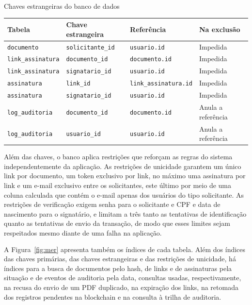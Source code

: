 \documentclass[
    12pt,
    a4paper,
    oneside,
    chapter=TITLE,
    section=TITLE,
    subsection=TITLE,
    subsubsection=TITLE,
    sumario=tradicional,
    english,
    brazil
]{abntex2}
\newcommand{\elem}[1]{\texttt{#1}}
\begin{document}
\begin{quadro}[htb]
    \caption{Chaves estrangeiras do banco de dados}
    \label{quadro:chaves}
    \centering
    \small
    \begin{tabular}{L{3.3cm}L{3.6cm}L{3.8cm}L{3.3cm}}
        \toprule
        \textbf{Tabela} & \textbf{Chave estrangeira} & \textbf{Referência} & \textbf{Na exclusão} \\
        \midrule
        \elem{documento} & \elem{solicitante\_id} & \elem{usuario.id} & Impedida \\
        \elem{link\_assinatura} & \elem{documento\_id} & \elem{documento.id} & Impedida \\
        \elem{link\_assinatura} & \elem{signatario\_id} & \elem{usuario.id} & Impedida \\
        \elem{assinatura} & \elem{link\_id} & \elem{link\_assinatura.id} & Impedida \\
        \elem{assinatura} & \elem{signatario\_id} & \elem{usuario.id} & Impedida \\
        \elem{log\_auditoria} & \elem{documento\_id} & \elem{documento.id} & Anula a referência \\
        \elem{log\_auditoria} & \elem{usuario\_id} & \elem{usuario.id} & Anula a referência \\
        \bottomrule
    \end{tabular}
\end{quadro}

Além das chaves, o banco aplica restrições que reforçam as regras do sistema independentemente da aplicação. As restrições de unicidade garantem um único link por documento, um token exclusivo por link, no máximo uma assinatura por link e um e-mail exclusivo entre os solicitantes, este último por meio de uma coluna calculada que contém o e-mail apenas dos usuários do tipo solicitante. As restrições de verificação exigem senha para o solicitante e CPF e data de nascimento para o signatário, e limitam a três tanto as tentativas de identificação quanto as tentativas de envio da transação, de modo que esses limites sejam respeitados mesmo diante de uma falha na aplicação.

A Figura~\ref{fig:mer} apresenta também os índices de cada tabela. Além dos índices das chaves primárias, das chaves estrangeiras e das restrições de unicidade, há índices para a busca de documentos pelo hash, de links e de assinaturas pela situação e de eventos de auditoria pela data, consultas usadas, respectivamente, na recusa do envio de um PDF duplicado, na expiração dos links, na retomada dos registros pendentes na blockchain e na consulta à trilha de auditoria.
\end{document}
